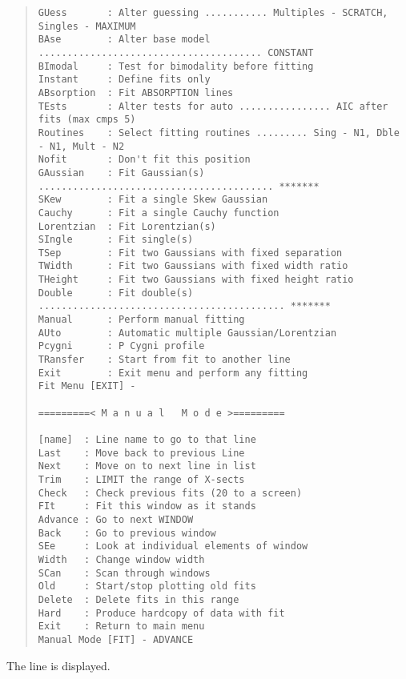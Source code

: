 \begin{quote}
\begin{verbatim}
GUess       : Alter guessing ........... Multiples - SCRATCH, Singles - MAXIMUM
BAse        : Alter base model ....................................... CONSTANT
BImodal     : Test for bimodality before fitting
Instant     : Define fits only
ABsorption  : Fit ABSORPTION lines
TEsts       : Alter tests for auto ................ AIC after fits (max cmps 5)
Routines    : Select fitting routines ......... Sing - N1, Dble - N1, Mult - N2
Nofit       : Don't fit this position
GAussian    : Fit Gaussian(s) ......................................... *******
SKew        : Fit a single Skew Gaussian
Cauchy      : Fit a single Cauchy function
Lorentzian  : Fit Lorentzian(s)
SIngle      : Fit single(s)
TSep        : Fit two Gaussians with fixed separation
TWidth      : Fit two Gaussians with fixed width ratio
THeight     : Fit two Gaussians with fixed height ratio
Double      : Fit double(s) ........................................... *******
Manual      : Perform manual fitting
AUto        : Automatic multiple Gaussian/Lorentzian
Pcygni      : P Cygni profile
TRansfer    : Start from fit to another line
Exit        : Exit menu and perform any fitting
Fit Menu [EXIT] -
 
=========< M a n u a l   M o d e >=========
 
[name]  : Line name to go to that line
Last    : Move back to previous Line
Next    : Move on to next line in list
Trim    : LIMIT the range of X-sects
Check   : Check previous fits (20 to a screen)
FIt     : Fit this window as it stands
Advance : Go to next WINDOW
Back    : Go to previous window
SEe     : Look at individual elements of window
Width   : Change window width
SCan    : Scan through windows
Old     : Start/stop plotting old fits
Delete  : Delete fits in this range
Hard    : Produce hardcopy of data with fit
Exit    : Return to main menu
Manual Mode [FIT] - ADVANCE
\end{verbatim}\end{quote}
The line is displayed.
